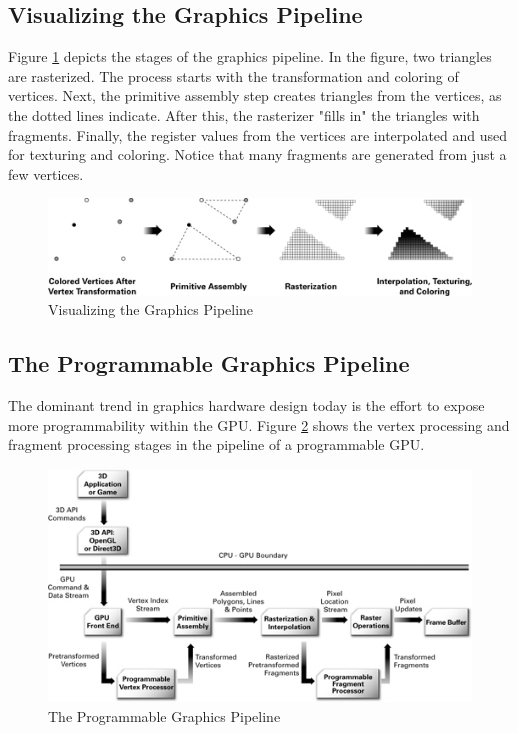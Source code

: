 \documentclass{book}
\begin{document}
\subsection*{Visualizing the Graphics Pipeline}

Figure \ref{fig:1-6} depicts the stages of the graphics pipeline. In the figure, two triangles are rasterized. The process starts with the transformation and coloring of vertices. Next, the primitive assembly step creates triangles from the vertices, as the dotted lines indicate. After this, the rasterizer "fills in" the triangles with fragments. Finally, the register values from the vertices are interpolated and used for texturing and coloring. Notice that many fragments are generated from just a few vertices.

\begin{figure}
    \centering
    \includegraphics[width=1\linewidth]{Images/fig1_6.jpg}
    \caption{Visualizing the Graphics Pipeline}
    \label{fig:1-6}
\end{figure}

\subsection{The Programmable Graphics Pipeline}

The dominant trend in graphics hardware design today is the effort to expose more programmability within the GPU. Figure \ref{fig:1-7} shows the vertex processing and fragment processing stages in the pipeline of a programmable GPU.

\begin{figure}
    \centering
    \includegraphics[width=1\linewidth]{Images/fig1_7.jpg}
    \caption{The Programmable Graphics Pipeline}
    \label{fig:1-7}
\end{figure}
\end{document}
